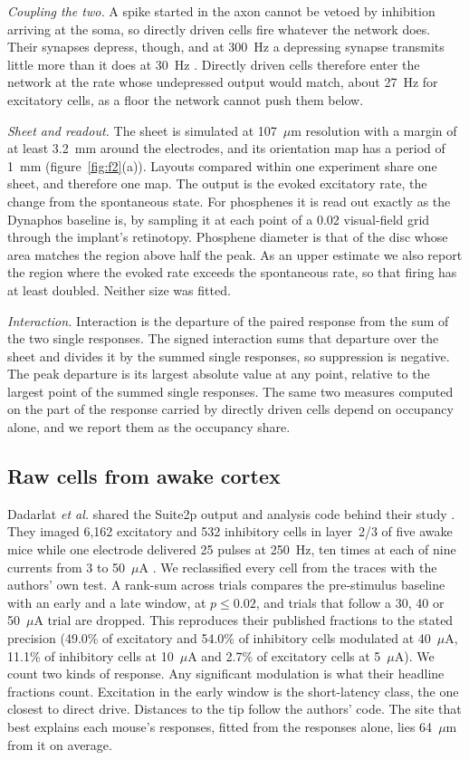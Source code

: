 \documentclass[10pt,twocolumn]{article}
\newcommand{\um}{\ensuremath{\mu\text{m}}}
\newcommand{\uA}{\ensuremath{\mu\text{A}}}
\begin{document}
\textit{Coupling the two.} A spike started in the axon cannot be vetoed by
inhibition arriving at the soma, so directly driven cells fire whatever the
network does. Their synapses depress, though, and at 300~Hz a depressing
synapse transmits little more than it does at 30~Hz
\citep{tsodyks1997,varela1997}. Directly driven cells therefore enter the
network at the rate whose undepressed output would match, about 27~Hz for
excitatory cells, as a floor the network cannot push them below.

\textit{Sheet and readout.} The sheet is simulated at 107~\um{}
resolution with a margin of at least 3.2~mm around the electrodes, and its
orientation map has a period of 1~mm (figure~\ref{fig:f2}(a)). Layouts
compared within one experiment share one sheet, and therefore one map. The
output is the evoked excitatory rate, the change from the spontaneous
state. For phosphenes it is read out exactly as the Dynaphos baseline is,
by sampling it at each point of a 0.02\textdegree{} visual-field grid
through the implant's retinotopy. Phosphene diameter is that of the disc
whose area matches the region above half the peak. As an upper estimate we
also report the region where the evoked rate exceeds the spontaneous rate,
so that firing has at least doubled. Neither size was fitted.

\textit{Interaction.} Interaction is the departure of the paired response
from the sum of the two single responses. The signed interaction sums that
departure over the sheet and divides it by the summed single responses, so
suppression is negative. The peak departure is its largest absolute value
at any point, relative to the largest point of the summed single
responses. The same two measures computed on the part of the response
carried by directly driven cells depend on occupancy alone, and we report
them as the occupancy share.

\subsection{Raw cells from awake cortex}
\label{sec:rawmethods}

Dadarlat \textit{et al.} shared the Suite2p output and analysis code behind
their study \citep{dadarlat2023data}. They imaged 6,162 excitatory and 532
inhibitory cells in layer~2/3 of five awake mice while one electrode
delivered 25 pulses at 250~Hz, ten times at each of nine currents from 3
to 50~\uA{} \citep{dadarlat2024}. We reclassified every cell from the
traces with the authors' own test. A rank-sum across trials compares the
pre-stimulus baseline with an early and a late window, at $p\le0.02$, and
trials that follow a 30, 40 or 50~\uA{} trial are dropped. This reproduces
their published fractions to the stated precision (49.0\% of excitatory
and 54.0\% of inhibitory cells modulated at 40~\uA, 11.1\% of inhibitory
cells at 10~\uA{} and 2.7\% of excitatory cells at 5~\uA). We count two
kinds of response. Any significant modulation is what their headline
fractions count. Excitation in the early window is the short-latency
class, the one closest to direct drive. Distances to the tip follow the
authors' code. The site that best explains each mouse's responses, fitted
from the responses alone, lies 64~\um{} from it on average.
\end{document}
